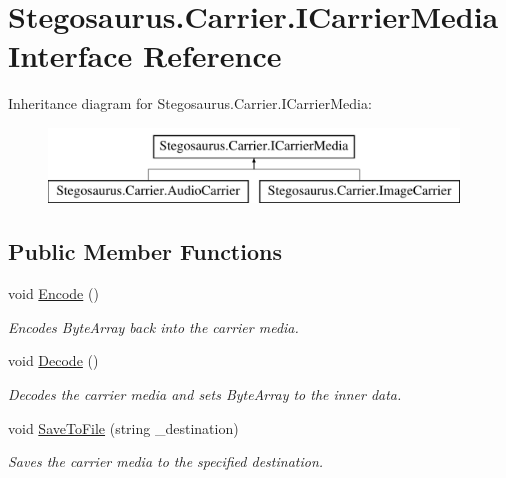 \hypertarget{interface_stegosaurus_1_1_carrier_1_1_i_carrier_media}{}\section{Stegosaurus.\+Carrier.\+I\+Carrier\+Media Interface Reference}
\label{interface_stegosaurus_1_1_carrier_1_1_i_carrier_media}
Inheritance diagram for Stegosaurus.\+Carrier.\+I\+Carrier\+Media\+:\begin{figure}[H]
\begin{center}
\leavevmode
\includegraphics[height=2.000000cm]{interface_stegosaurus_1_1_carrier_1_1_i_carrier_media}
\end{center}
\end{figure}
\subsection*{Public Member Functions}
\begin{DoxyCompactItemize}
\item 
void \hyperlink{interface_stegosaurus_1_1_carrier_1_1_i_carrier_media_ac7d498eec146a74dbbaa2bd60e5bdce7}{Encode} ()
\begin{DoxyCompactList}\small\item\em Encodes Byte\+Array back into the carrier media. \end{DoxyCompactList}\item 
void \hyperlink{interface_stegosaurus_1_1_carrier_1_1_i_carrier_media_a863ecfa01ac50d9bb4a7619ce3f14fad}{Decode} ()
\begin{DoxyCompactList}\small\item\em Decodes the carrier media and sets Byte\+Array to the inner data. \end{DoxyCompactList}\item 
void \hyperlink{interface_stegosaurus_1_1_carrier_1_1_i_carrier_media_a419a6ed82dc1053f25e42a26e2fbade3}{Save\+To\+File} (string \+\_\+destination)
\begin{DoxyCompactList}\small\item\em Saves the carrier media to the specified destination. \end{DoxyCompactList}\end{DoxyCompactItemize}
